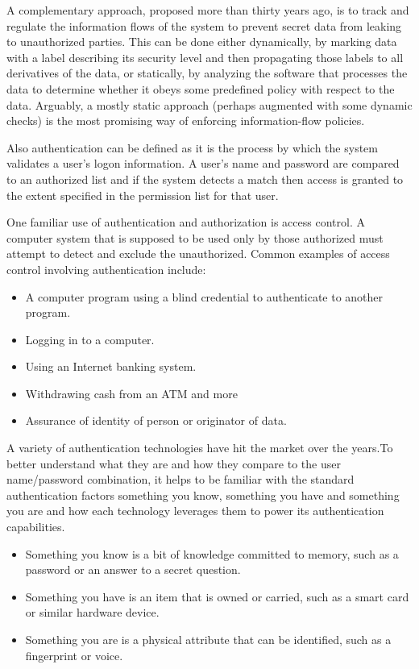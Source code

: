 A complementary approach, proposed more than thirty years ago, is to track and regulate the information flows of the system to prevent secret data from leaking to unauthorized parties. This can be done either dynamically, by marking data with a label describing its security level and then propagating those labels to all derivatives of the data, or statically, by analyzing the software that processes
the data to determine whether it obeys some predefined policy with respect to the data. Arguably, a mostly static approach (perhaps augmented with some dynamic checks) is the most promising way of enforcing information-flow policies.

Also authentication can be defined as it is the process by which the system validates a user's logon information. A user's name and password are compared to an authorized list and if the system detects a match then access is granted to the extent specified in the permission list for that user.

One familiar use of authentication and authorization is access control. A computer system that is supposed to be used only by those authorized must attempt to detect and exclude the unauthorized. Common examples of access control involving authentication include:
\begin{itemize}	
	\item A computer program using a blind credential to authenticate to another program.
	\item Logging in to a computer.	
	\item Using an Internet banking system.
	\item Withdrawing cash from an ATM and more
	\item Assurance of identity of person or originator of data.
\end{itemize}

 A variety of authentication technologies have hit the market over the years.To better understand what they are and how they compare to the user name/password combination, it helps to be familiar with the standard authentication factors something you know, something you have and something you are and how each technology leverages them to power its authentication capabilities.
 \begin{itemize}	
	\item Something you know is a bit of knowledge committed to memory, such as a password or
	 an answer to a secret question.
	\item Something you have is an item that is owned or carried, such as a smart card or similar
	 hardware device.
	\item	 Something you are is a physical attribute that can be identified, such as a fingerprint or voice.
\end{itemize}

